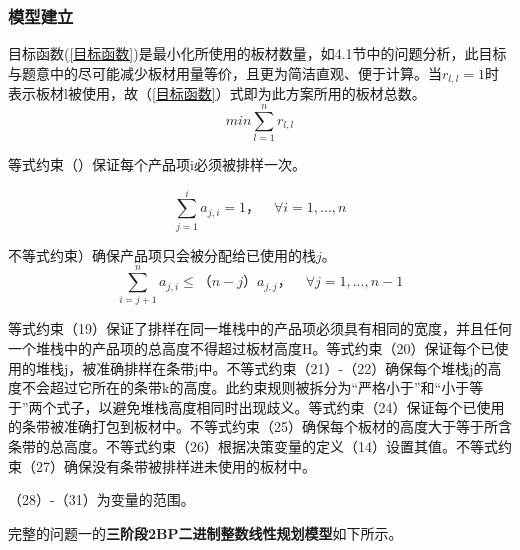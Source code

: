 \documentclass[bwprint]{gmcmthesis}
\begin{document}
\subsubsection{模型建立}



目标函数(\ref{目标函数})是最小化所使用的板材数量，如4.1节中的问题分析，此目标与题意中的尽可能减少板材用量等价，且更为简洁直观、便于计算。当$ r_{l,l}=1 $时表示板材l被使用，故（\ref{目标函数}）式即为此方案所用的板材总数。
\begin{equation}
    min \sum_{l=1}^{n}  r_{l,l} \label{目标函数}
 \end{equation}


等式约束（\label{产品项必须排}）保证每个产品项i必须被排样一次。

\begin{equation}
    \sum_{j=1}^{i}  a_{j,i} =1，\quad \forall i=1,...,n \label{产品项必须排}
\end{equation}


不等式约束\label{产品项只给已使用堆栈}）确保产品项只会被分配给已使用的栈$j$。
\begin{equation}
   \sum_{i=j+1}^{n}  a_{j,i} \le （n-j）a_{j,j}，\quad \forall j=1,...,n-1 \label{产品项只给已使用堆栈}
\end{equation}

等式约束（19）保证了排样在同一堆栈中的产品项必须具有相同的宽度，并且任何一个堆栈中的产品项的总高度不得超过板材高度H。等式约束（20）保证每个已使用的堆栈j，被准确排样在条带j中。不等式约束（21）-（22）确保每个堆栈j的高度不会超过它所在的条带k的高度。此约束规则被拆分为“严格小于”和“小于等于”两个式子，以避免堆栈高度相同时出现歧义。等式约束（24）保证每个已使用的条带被准确打包到板材中。不等式约束（25）确保每个板材的高度大于等于所含条带的总高度。不等式约束（26）根据决策变量的定义（14）设置其值。不等式约束（27）确保没有条带被排样进未使用的板材中。

（28）-（31）为变量的范围。

完整的问题一的\textbf{三阶段2BP二进制整数线性规划模型}如下所示。
\end{document}
